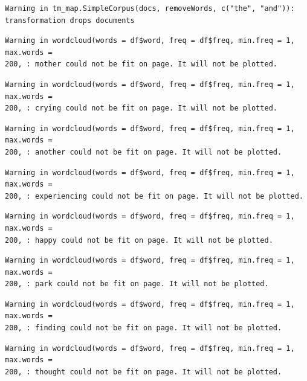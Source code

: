 \documentclass[
  .7em,
  letterpaper,
  DIV=11,
  numbers=noendperiod]{scrartcl}
\begin{document}
\begin{verbatim}
Warning in tm_map.SimpleCorpus(docs, removeWords, c("the", "and")):
transformation drops documents
\end{verbatim}

\begin{verbatim}
Warning in wordcloud(words = df$word, freq = df$freq, min.freq = 1, max.words =
200, : mother could not be fit on page. It will not be plotted.
\end{verbatim}

\begin{verbatim}
Warning in wordcloud(words = df$word, freq = df$freq, min.freq = 1, max.words =
200, : crying could not be fit on page. It will not be plotted.
\end{verbatim}

\begin{verbatim}
Warning in wordcloud(words = df$word, freq = df$freq, min.freq = 1, max.words =
200, : another could not be fit on page. It will not be plotted.
\end{verbatim}

\begin{verbatim}
Warning in wordcloud(words = df$word, freq = df$freq, min.freq = 1, max.words =
200, : experiencing could not be fit on page. It will not be plotted.
\end{verbatim}

\begin{verbatim}
Warning in wordcloud(words = df$word, freq = df$freq, min.freq = 1, max.words =
200, : happy could not be fit on page. It will not be plotted.
\end{verbatim}

\begin{verbatim}
Warning in wordcloud(words = df$word, freq = df$freq, min.freq = 1, max.words =
200, : park could not be fit on page. It will not be plotted.
\end{verbatim}

\begin{verbatim}
Warning in wordcloud(words = df$word, freq = df$freq, min.freq = 1, max.words =
200, : finding could not be fit on page. It will not be plotted.
\end{verbatim}

\begin{verbatim}
Warning in wordcloud(words = df$word, freq = df$freq, min.freq = 1, max.words =
200, : thought could not be fit on page. It will not be plotted.
\end{verbatim}
\end{document}
